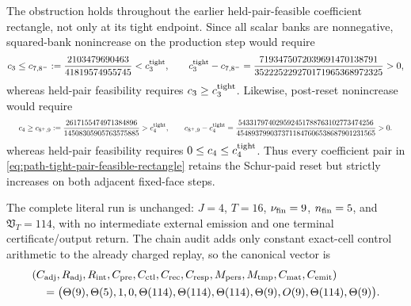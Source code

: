 \begin{proposition}
The obstruction holds throughout the earlier held-pair-feasible coefficient
rectangle, not only at its tight endpoint.  Since all scalar banks are
nonnegative, squared-bank nonincrease on the production step would require
\begin{equation}
 c_3\leq c_{7,8^-}:=
 \frac{2103479690463}{41819574955745}
 <c_3^{\rm tight},
 \qquad
 c_3^{\rm tight}-c_{7,8^-}
 =\frac{7193475072039691470138791}
        {352225229270171965368972325}>0,
 \label{eq:path-tight-pair-production-coefficient-stop}
\end{equation}
whereas held-pair feasibility requires $c_3\geq c_3^{\rm tight}$.
Likewise, post-reset nonincrease would require
\begin{equation}
 \resizebox{0.98\linewidth}{!}{$
 \displaystyle
 c_4\geq c_{8^+,9}:=
 \frac{2617155474971384896}{14508305905763575885}
 >c_4^{\rm tight},
 \qquad
 c_{8^+,9}-c_4^{\rm tight}
 =\frac{543317974029592451788763102773474256}
        {4548937990373711847606538687901231565}>0.
 $}
 \label{eq:path-tight-pair-followup-coefficient-stop}
\end{equation}
whereas held-pair feasibility requires
$0\leq c_4\leq c_4^{\rm tight}$.  Thus every coefficient pair in
\cref{eq:path-tight-pair-feasible-rectangle} retains the Schur-paid reset but
strictly increases on both adjacent fixed-face steps.

The complete literal run is unchanged:
$J=4$, $T=16$, $\nu_{\rm fin}=9$, $n_{\rm fin}=5$, and
$\mathfrak V_T=114$, with no intermediate external emission and one terminal
certificate/output return.  The chain audit adds only constant exact-cell
control arithmetic to the already charged replay, so the canonical vector is
\begin{equation}
 \begin{aligned}
 &(C_{\rm adj},R_{\rm adj},R_{\rm int},C_{\rm pre},C_{\rm ctl},C_{\rm rec},
 C_{\rm resp},M_{\rm pers},M_{\rm tmp},C_{\rm mat},C_{\rm emit})\\
 &\quad=\bigl(\Theta(9),\Theta(5),1,0,
       \Theta(114),\Theta(114),\Theta(114),
       \Theta(9),O(9),\Theta(114),\Theta(9)\bigr).
 \end{aligned}
 \label{eq:path-tight-pair-local-chain-eleven-vector}
\end{equation}
\end{proposition}

